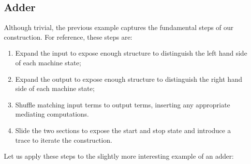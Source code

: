 \documentclass{llncs}
\begin{document}
{%

\subsection{Adder} 


Although trivial, the previous example captures the fundamental steps of our
construction. For reference, these steps are:
\begin{enumerate}
\item Expand the input to expose enough structure to distinguish the left
  hand side of each machine state; 
\item Expand the output to expose enough structure to distinguish the right
  hand side of each machine state;
\item Shuffle matching input terms to output terms, inserting any appropriate
  mediating computations. 
\item Slide the two sections to expose the start and stop state and introduce
  a {{trace}} to iterate the construction.
\end{enumerate}

Let us apply these steps to the slightly more interesting example of an
adder:
\begin{multicols}{2}  

\end{multicols}

}
\end{document}
